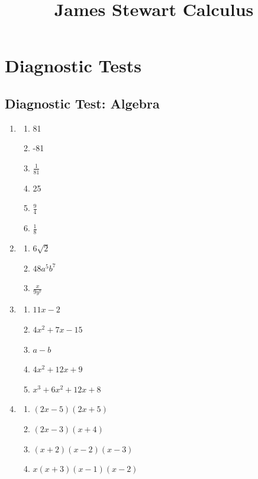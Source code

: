 \documentclass{article}
\title{James Stewart Calculus}
\author{}
\date{}
\begin{document}
\maketitle
\section*{Diagnostic Tests}
\subsection{Diagnostic Test: Algebra}
\begin{enumerate}
    \item \begin{enumerate}[label=(\alph*)]
              \item 81
              \item -81
              \item $\frac{1}{81}$
              \item 25
              \item $\frac{9}{4}$
              \item $\frac{1}{8}$
          \end{enumerate}
    \item \begin{enumerate}[label=(\alph*)]
              \item $6\sqrt{2}$
              \item $48a^5b^7$
              \item $\frac{x}{9y^7}$
          \end{enumerate}
    \item \begin{enumerate}[label=(\alph*)]
              \item $11x-2$
              \item $4x^2+7x-15$
              \item $a-b$
              \item $4x^2+12x+9$
              \item $x^3+6x^2+12x+8$
          \end{enumerate}
    \item \begin{enumerate}[label=(\alph*)]
              \item $(2x-5)(2x+5)$
              \item $(2x-3)(x+4)$
              \item $(x+2)(x-2)(x-3)$
              \item $x(x+3)(x-1)(x-2)$

\end{enumerate}
\end{enumerate}
\end{document}
